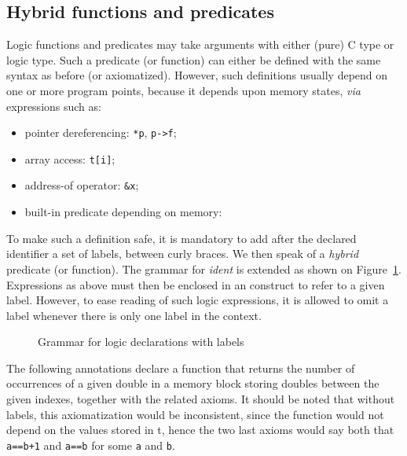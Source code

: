 \subsection{Hybrid functions and predicates}
\label{sec:logicalstates}

Logic functions and predicates may take arguments with
either (pure) C type or logic
type. Such a predicate (or function)
can either be defined with the same syntax as before (or axiomatized).
However, such definitions usually depend on one or
more program points, because it depends upon memory states, \emph{via}
expressions such as:
\begin{itemize}
\item pointer dereferencing: \lstinline|*p|, \lstinline|p->f|;
\item array access: \lstinline|t[i]|;
\item address-of operator: \lstinline|&x|;
\item built-in predicate depending on memory: \valid
\end{itemize}
To make such a definition safe, it is mandatory to add after the
declared identifier a set of labels, between curly braces. We then speak
of a \textit{hybrid} predicate (or function).
The grammar for \textit{ident} is extended as shown on
Figure~\ref{fig:gram:logiclabels}. Expressions
as above must then be enclosed in an \at{} construct to refer to a
given label. However, to ease reading of such logic expressions, it
is allowed to omit a label whenever there is only one label in the
context.

\begin{figure}[htp]
  \begin{cadre}
      
    \end{cadre}
  \caption{Grammar for logic declarations with labels}
\label{fig:gram:logiclabels}
\end{figure}

\begin{example}\label{ex:nb_occ}
  The following annotations declare a function that returns the
  number of occurrences of a given double in a memory block storing doubles
  between the given indexes, together with the related axioms.  It
  should be noted that without labels, this axiomatization would be
  inconsistent, since the function would not depend on the values
  stored in t, hence the two last axioms would say both that \lstinline|a==b+1|
  and \lstinline|a==b| for some \lstinline|a| and \lstinline|b|.
\end{example}

